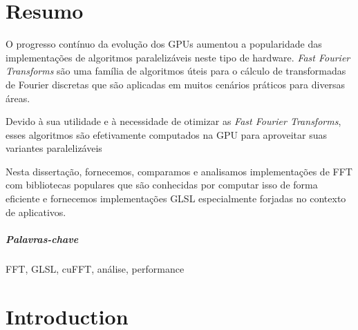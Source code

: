 \documentclass[
  oneside,
  11pt, a4paper,
  footinclude=true,
  headinclude=true,
  cleardoublepage=empty
]{scrbook}
\begin{document}
    \cleardoublepage


\chapter*{Resumo}

O progresso contínuo da evolução dos GPUs aumentou a popularidade das implementações de algoritmos paralelizáveis ​​neste tipo de hardware.
\textit{Fast Fourier Transforms} são uma família de algoritmos úteis para o cálculo de transformadas de Fourier discretas que são aplicadas em muitos cenários práticos para diversas áreas.

Devido à sua utilidade e à necessidade de otimizar as \textit{Fast Fourier Transforms}, esses algoritmos são efetivamente computados na GPU para aproveitar suas variantes paralelizáveis

Nesta dissertação, fornecemos, comparamos e analisamos implementações de FFT com bibliotecas populares que são conhecidas por computar isso de forma eficiente e fornecemos implementações GLSL especialmente forjadas no contexto de aplicativos.
    
\paragraph{Palavras-chave} FFT, GLSL, cuFFT, análise, performance


    \cleardoublepage
    
    \setcounter{page}{3}
    
    \cleardoublepage
    \tableofcontents
    
    \cleardoublepage
    \listoffigures
    
    \cleardoublepage
    \listoftables
    

    
    \cleardoublepage
    \setcounter{page}{5}


\chapter{Introduction} \label{chap:introduction}
\end{document}
